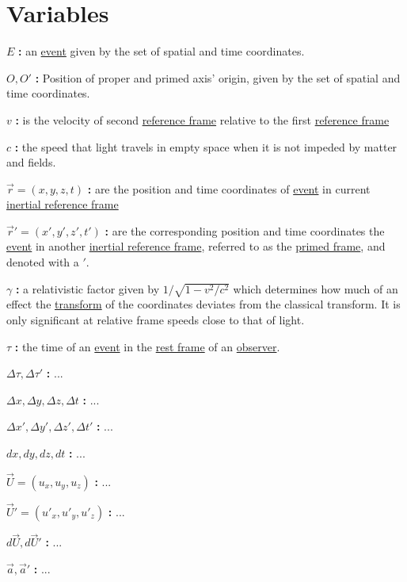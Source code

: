 \section{Variables}

\noindent ${E}$ \textbf{:}
an \hyperlink{def-event}{event} given by the set of spatial and time coordinates. %

\noindent ${O},{O'}$ \textbf{:}
Position of proper and primed axis' origin, given by the set of spatial and time coordinates.

\noindent ${v}$ \textbf{:}
is the velocity of second \hyperlink{def-Reference-frame}{reference frame} relative to the first \hyperlink{def-Reference-frame}{reference frame}

\noindent ${c}$ \textbf{:}
the speed that light travels in empty space when it is not impeded by matter and fields.

\noindent ${\vec{r}}=({x},{y},{z},{t})$ \textbf{:}
are the position and time coordinates of \hyperlink{def-event}{event} in current \hyperlink{def-Inertial-reference-frame}{inertial reference frame}

\noindent ${\vec{r}'}=({x'},{y'},{z'},{t'})$ \textbf{:}
are the corresponding position and time coordinates the \hyperlink{def-event}{event} in another \hyperlink{def-Inertial-reference-frame}{inertial reference frame}, referred to as the \hyperlink{def-Primed-Frame}{primed frame}, and denoted with a ${'}$.

\noindent ${\gamma}$ \textbf{:}
a relativistic factor given by ${1/\sqrt{1-v^2/c^2}}$ which determines how much of an effect the \hyperlink{def-transform}{transform} of the coordinates deviates from the classical transform. It is only significant at relative frame speeds close to that of light.

\noindent ${\tau}$ \textbf{:}
the time of an \hyperlink{def-event}{event} in the \hyperlink{def-proper-frame}{rest frame} of an \hyperlink{def-observer}{observer}.

\noindent ${\Delta \tau,\Delta \tau'}$ \textbf{:}
...

\noindent ${\Delta x},{\Delta y},{\Delta z},{\Delta t}$ \textbf{:}
...

\noindent ${\Delta x'},{\Delta y'},{\Delta z'},{\Delta t'}$ \textbf{:}
...

\noindent ${dx},{dy},{dz},{dt}$ \textbf{:}
...

\noindent ${\vec{U}}=({u_x},{u_y},{u_z})$ \textbf{:}
...

\noindent ${\vec{U}'}=({u'_x},{u'_y},{u'_z})$ \textbf{:}
...

\noindent ${d\vec{U}},{d\vec{U}'}$ \textbf{:}
...

\noindent ${\vec{a}},{\vec{a}'}$ \textbf{:}
...
